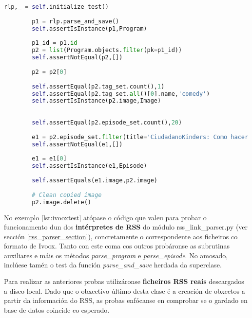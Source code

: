 \begin{lstlisting}[language=Python, caption=Probas de unidade dos metodos de ParserIvoox, label=lst:ivooxtest]
		rlp,_ = self.initialize_test()
		
		p1 = rlp.parse_and_save()
		self.assertIsInstance(p1,Program)
		
		p1_id = p1.id
		p2 = list(Program.objects.filter(pk=p1_id))
		self.assertNotEqual(p2,[])
		
		p2 = p2[0]
		
		self.assertEqual(p2.tag_set.count(),1)
		self.assertEqual(p2.tag_set.all()[0].name,'comedy')
		self.assertIsInstance(p2.image,Image)
		
		
		self.assertEqual(p2.episode_set.count(),20)
		
		e1 = p2.episode_set.filter(title='CiudadanoKinders: Como hacer un monologo')
		self.assertNotEqual(e1,[])
		
		e1 = e1[0]
		self.assertIsInstance(e1,Episode)
		
		self.assertEquals(e1.image,p2.image)
		
		# Clean copied image
		p2.image.delete()
\end{lstlisting}   

No exemplo \ref{lst:ivooxtest} atópase o código que valeu para probar o funcionamento dun dos \textbf{intérpretes de RSS} do módulo rss\_link\_parser.py (ver sección \ref{rss_parser_section}), concretamente o correspondente aos ficheiros co formato de Ivoox.  Tanto con este coma cos outros  probáronse as subrutinas auxiliares e máis os métodos \textit{parse\_program} e \textit{parse\_episode}. No amosado, inclúese tamén o test da función \textit{parse\_and\_save} herdada da superclase.

Para realizar as anteriores probas utilizáronse \textbf{ficheiros RSS reais} descargados a disco local. Dado que o obxectivo último desta clase é a creación de obxectos a partir da información do RSS, as probas enfócanse en comprobar se o gardado en base de datos coincide co esperado.



